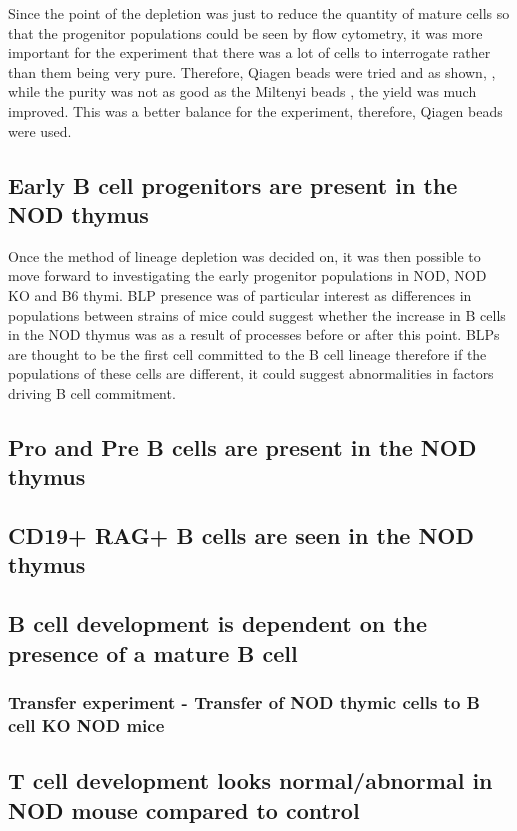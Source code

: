 Since the point of the depletion was just to reduce the quantity of mature cells so that the progenitor populations could be seen by flow cytometry, it was more important for the experiment that there was a lot of cells to interrogate rather than them being very pure.
Therefore, Qiagen beads were tried and as shown, , while the purity was not as good as the Miltenyi beads , the yield was much improved.
This was a better balance for the experiment, therefore, Qiagen beads were used.

\subsection{Early B cell progenitors are present in the NOD thymus}
Once the method of lineage depletion was decided on, it was then possible to move forward to investigating the early progenitor populations in NOD, NOD KO and B6 thymi.
BLP presence was of particular interest as differences in populations between strains of mice could suggest whether the increase in B cells in the NOD thymus was as a result of processes before or after this point.
BLPs are thought to be the first cell committed to the B cell lineage therefore if the populations of these cells are different, it could suggest abnormalities in factors driving B cell commitment.


\subsection{Pro and Pre B cells are present in the NOD thymus}

\subsection{CD19+ RAG+ B cells are seen in the NOD thymus}


\subsection{B cell development is dependent on the presence of a mature B cell}
\subsubsection{Transfer experiment - Transfer of NOD thymic cells to B cell KO NOD mice}

\subsection{T cell development looks normal/abnormal in NOD mouse compared to control}

